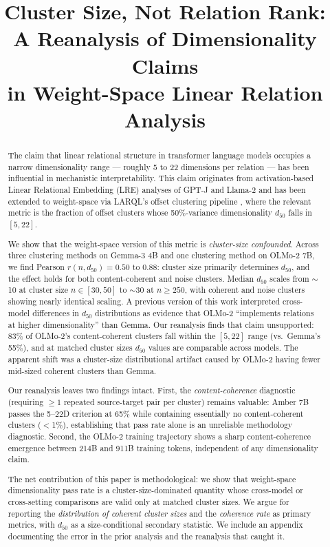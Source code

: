\documentclass[11pt,letterpaper]{article}
\title{Cluster Size, Not Relation Rank:\\
A Reanalysis of Dimensionality Claims\\
in Weight-Space Linear Relation Analysis}
\author{}
\date{}
\begin{document}
\maketitle

\begin{abstract}
\noindent The claim that linear relational structure in transformer language models occupies a narrow dimensionality range --- roughly 5 to 22 dimensions per relation --- has been influential in mechanistic interpretability. This claim originates from activation-based Linear Relational Embedding (LRE) analyses of GPT-J and Llama-2 \citep{hernandez2024linearity, chanin2023identifying} and has been extended to weight-space via LARQL's offset clustering pipeline \citep{hayuk2026}, where the relevant metric is the fraction of offset clusters whose 50\%-variance dimensionality $d_{50}$ falls in $[5,22]$.

We show that the weight-space version of this metric is \emph{cluster-size confounded}. Across three clustering methods on Gemma-3 4B and one clustering method on OLMo-2 7B, we find Pearson $r(n, d_{50}) = 0.50$ to $0.88$: cluster size primarily determines $d_{50}$, and the effect holds for both content-coherent and noise clusters. Median $d_{50}$ scales from $\sim$10 at cluster size $n \in [30, 50]$ to $\sim$30 at $n \geq 250$, with coherent and noise clusters showing nearly identical scaling. A previous version of this work interpreted cross-model differences in $d_{50}$ distributions as evidence that OLMo-2 ``implements relations at higher dimensionality'' than Gemma. Our reanalysis finds that claim unsupported: 83\% of OLMo-2's content-coherent clusters fall within the $[5, 22]$ range (vs.\ Gemma's 55\%), and at matched cluster sizes $d_{50}$ values are comparable across models. The apparent shift was a cluster-size distributional artifact caused by OLMo-2 having fewer mid-sized coherent clusters than Gemma.

Our reanalysis leaves two findings intact. First, the \emph{content-coherence} diagnostic (requiring $\geq 1$ repeated source-target pair per cluster) remains valuable: Amber 7B passes the 5--22D criterion at 65\% while containing essentially no content-coherent clusters ($<$1\%), establishing that pass rate alone is an unreliable methodology diagnostic. Second, the OLMo-2 training trajectory shows a sharp content-coherence emergence between 214B and 911B training tokens, independent of any dimensionality claim.

The net contribution of this paper is methodological: we show that weight-space dimensionality pass rate is a cluster-size-dominated quantity whose cross-model or cross-setting comparisons are valid only at matched cluster sizes. We argue for reporting the \emph{distribution of coherent cluster sizes} and the \emph{coherence rate} as primary metrics, with $d_{50}$ as a size-conditional secondary statistic. We include an appendix documenting the error in the prior analysis and the reanalysis that caught it.
\end{abstract}
\end{document}
